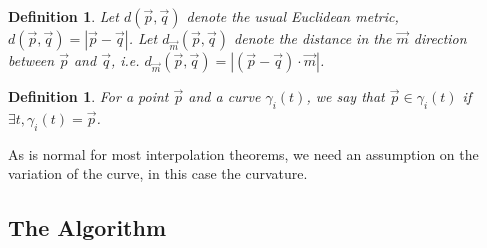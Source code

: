 \documentclass{article}
\newtheorem{definition}[cntr]{Definition}
\numberwithin{cntr}{section}
\numberwithin{equation}{section}
\newcommand{\abs}[1]{\left| #1 \right|}%
\newcommand{\vp}[0]{{\vec{p}}}
\newcommand{\vq}[0]{{\vec{q}}}
\newcommand{\vm}[0]{{\vec{m}}}
\begin{document}
\begin{definition}
  \label{def:metric}
  Let $d(\vp,\vq)$ denote the usual Euclidean metric, $d(\vp,\vq) = \abs{\vp - \vq}$. Let $d_{\vm}(\vp,\vq)$ denote the distance in the $\vm$ direction between $\vp$ and $\vq$, i.e. $d_{\vm}(\vp,\vq) = \abs{ (\vp - \vq) \cdot \vm}$.
\end{definition}

\begin{definition}
  For a point $\vp$ and a curve $\gamma_{i}(t)$, we say that $\vp \in \gamma_{i}(t)$ if $\exists t, \gamma_{i}(t)=\vp$.
\end{definition}

As is normal for most interpolation theorems, we need an assumption on the variation of the curve, in this case the curvature.

\subsection{The Algorithm}
\end{document}
